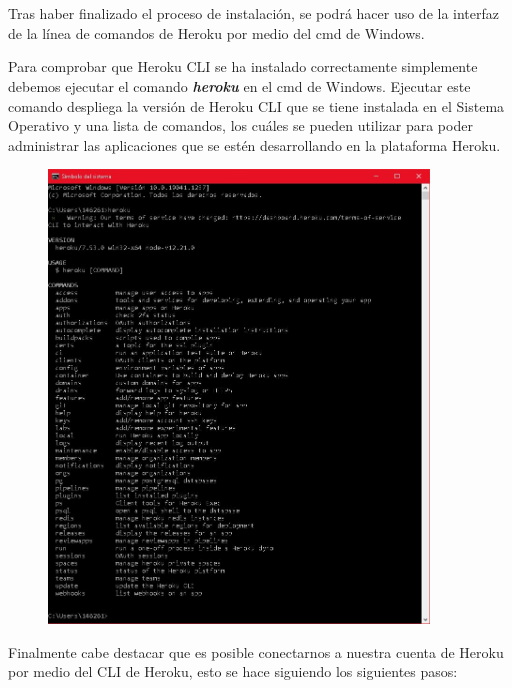 \documentclass[10pt,a4paper]{article} %
\begin{document}
	\section{\color{colorIPN}{Resultados}}
	{\large Tras haber finalizado el proceso de instalaci{\'o}n, se podr{\'a} hacer uso de la interfaz de la l{\'i}nea de comandos de Heroku por medio del cmd de Windows. 
		
		
		\vspace{0.5cm}
		Para comprobar que Heroku CLI se ha instalado correctamente simplemente debemos ejecutar el comando \textbf{\textit{heroku}} en el cmd de Windows. Ejecutar este comando despliega la versi{\'o}n de Heroku CLI que se tiene instalada en el Sistema Operativo y una lista de comandos, los cu{\'a}les se pueden utilizar para poder administrar las aplicaciones que se est{\'e}n desarrollando en la plataforma Heroku.
		
		\begin{figure}[H]
			\includegraphics[width=0.9\textwidth]{resultado.jpg}
			\centering
			\label{img:resultado}
		\end{figure}
		
		\pagebreak
		Finalmente cabe destacar que es posible conectarnos a nuestra cuenta de Heroku por medio del CLI de Heroku, esto se hace siguiendo los siguientes pasos:}
	
\end{document}
